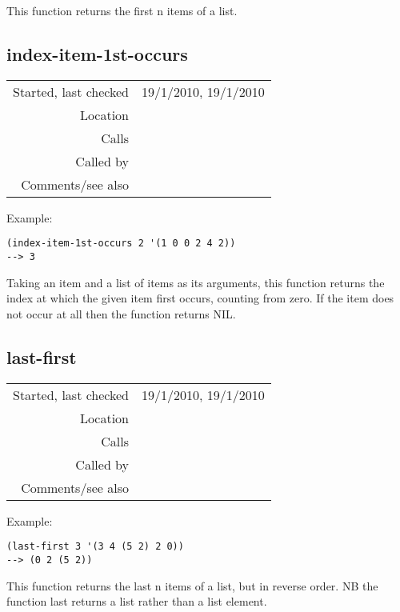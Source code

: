 \noindent This function returns the first n items of a
list.


\subsection*{index-item-1st-occurs}\label{fun:index-item-1st-occurs}

\vspace{0.3cm}
\begin{tabular}{r|p{8cm}}
Started, last checked & 19/1/2010, 19/1/2010 \\
Location & \nameref{sec:list-processing} \\
Calls & \\
Called by & \\
Comments/see also & 
\end{tabular}

\vspace{0.5cm}
\noindent Example:
\begin{verbatim}
(index-item-1st-occurs 2 '(1 0 0 2 4 2))
--> 3
\end{verbatim}

\noindent Taking an item and a list of items as its
arguments, this function returns the index at which
the given item first occurs, counting from zero. If
the item does not occur at all then the function
returns NIL.


\subsection*{last-first}\label{fun:last-first}

\vspace{0.3cm}
\begin{tabular}{r|p{8cm}}
Started, last checked & 19/1/2010, 19/1/2010 \\
Location & \nameref{sec:list-processing} \\
Calls & \\
Called by & \nameref{fun:lastn} \\
Comments/see also & 
\end{tabular}

\vspace{0.5cm}
\noindent Example:
\begin{verbatim}
(last-first 3 '(3 4 (5 2) 2 0))
--> (0 2 (5 2))
\end{verbatim}

\noindent This function returns the last n items of a
list, but in reverse order. NB the function last
returns a list rather than a list element.


